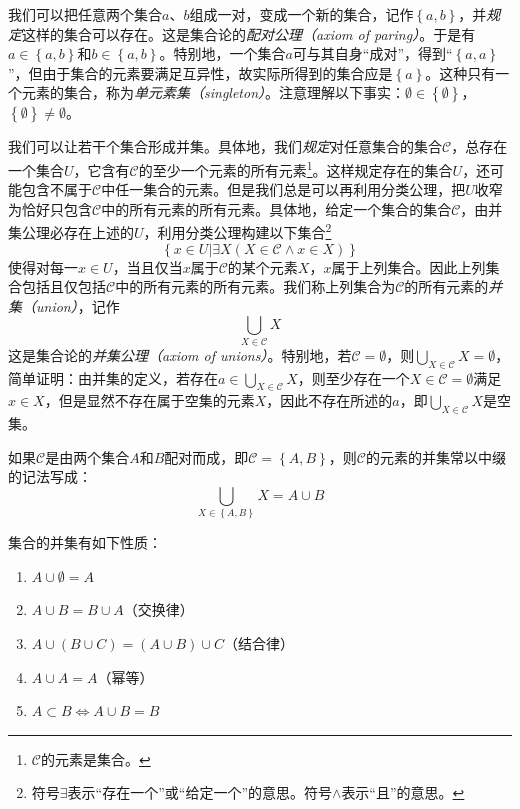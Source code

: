 \documentclass[../main.tex]{subfiles}
\begin{document}
我们可以把任意两个集合$a$、$b$组成一对，变成一个新的集合，记作$\left\{a,b\right\}$，并\emph{规定}这样的集合可以存在。这是集合论的\emph{配对公理（axiom of paring）}。于是有$a\in \left\{a,b\right\}$和$b\in \left\{a,b\right\}$。特别地，一个集合$a$可与其自身“成对”，得到“$\left\{a,a\right\}$”，但由于集合的元素要满足互异性，故实际所得到的集合应是$\left\{a\right\}$。这种只有一个元素的集合，称为\emph{单元素集（singleton）}。注意理解以下事实：$\emptyset\in\left\{\emptyset\right\}$，$\left\{\emptyset\right\}\neq\emptyset$。

我们可以让若干个集合形成并集。具体地，我们\emph{规定}对任意集合的集合$\mathcal{C}$，总存在一个集合$U$，它含有$\mathcal{C}$的至少一个元素的所有元素\footnote{$\mathcal{C}$的元素是集合。}。这样规定存在的集合$U$，还可能包含不属于$\mathcal{C}$中任一集合的元素。但是我们总是可以再利用分类公理，把$U$收窄为恰好只包含$\mathcal{C}$中的所有元素的所有元素。具体地，给定一个集合的集合$\mathcal{C}$，由并集公理必存在上述的$U$，利用分类公理构建以下集合\footnote{符号$\exists$表示“存在一个”或“给定一个”的意思。符号$\wedge$表示“且”的意思。}
\begin{equation*}\label{eq:set_union}
    \left\{x\in U|\exists X\left(X\in\mathcal{C}\wedge x\in X\right)\right\}
\end{equation*}
使得对每一$x\in U$，当且仅当$x$属于$\mathcal{C}$的某个元素$X$，$x$属于上列集合。因此上列集合包括且仅包括$\mathcal{C}$中的所有元素的所有元素。我们称上列集合为$\mathcal{C}$的所有元素的\emph{并集（union）}，记作
\[
    \bigcup_{X\in\mathcal{C}}X
\]
这是集合论的\emph{并集公理（axiom of unions）}。特别地，若$\mathcal{C}=\emptyset$，则$\bigcup_{X\in\mathcal{C}}X=\emptyset$，简单证明：由并集的定义，若存在$a\in\bigcup_{X\in\mathcal{C}}X$，则至少存在一个$X\in\mathcal{C}=\emptyset$满足$x\in X$，但是显然不存在属于空集的元素$X$，因此不存在所述的$a$，即$\bigcup_{X\in\mathcal{C}}X$是空集。

如果$\mathcal{C}$是由两个集合$A$和$B$配对而成，即$\mathcal{C}=\left\{A,B\right\}$，则$\mathcal{C}$的元素的并集常以中缀的记法写成：
\[
    \bigcup_{X\in\left\{A,B\right\}}X= A\cup B
\]

集合的并集有如下性质：

\begin{enumerate}
    \item $A\cup \emptyset=A$
    \item $A\cup B=B\cup A$（交换律）
    \item $A\cup\left(B\cup C\right)=\left(A\cup B\right)\cup C$（结合律）
    \item $A\cup A=A$（幂等）
    \item $A\subset B\Leftrightarrow A\cup B=B$
\end{enumerate}
\end{document}
